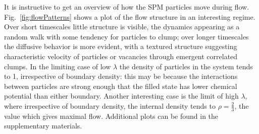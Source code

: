 \documentclass[
reprint,
 amsmath,amssymb,
 aps,
 prl
]{revtex4-1}
\begin{document}
It is instructive to get an overview of how the SPM particles move
during flow. Fig.~\ref{fig:flowPatterns} shows a plot of the flow
structure in an interesting regime.  Over short timescales little
structure is visible, the dynamics appearing as a random walk with
some tendency for particles to clump; over longer timescales the
diffusive behavior is more evident, with a textured structure
suggesting characteristic velocity of particles or vacancies through
emergent correlated clumps.  In the limiting case of low $\lambda$ the
density of particles in the system tends to 1, irrespective of
boundary density: this may be because the interactions between
particles are strong enough that the filled state has lower chemical 
potential than either boundary.  Another interesting case is the limit of
high $\lambda$, where irrespective of boundary density, the internal
density tends to $\rho=\frac{2}{3}$, the value which gives maximal
flow.  Additional plots can be found in the supplementary materials.
\end{document}
